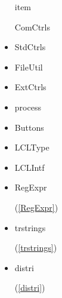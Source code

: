 \documentclass{report}
\begin{document}
\begin{itemize}
item \begin{ttfamily}ComCtrls\end{ttfamily}\item \begin{ttfamily}StdCtrls\end{ttfamily}\item \begin{ttfamily}FileUtil\end{ttfamily}\item \begin{ttfamily}ExtCtrls\end{ttfamily}\item \begin{ttfamily}process\end{ttfamily}\item \begin{ttfamily}Buttons\end{ttfamily}\item \begin{ttfamily}LCLType\end{ttfamily}\item \begin{ttfamily}LCLIntf\end{ttfamily}\item \begin{ttfamily}RegExpr\end{ttfamily}(\ref{RegExpr})\item \begin{ttfamily}trstrings\end{ttfamily}(\ref{trstrings})\item \begin{ttfamily}distri\end{ttfamily}(\ref{distri})\end{itemize}
\end{document}
